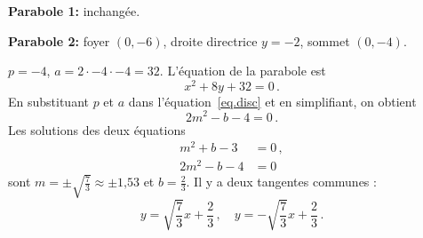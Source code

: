 \begin{example}\mbox{}

\noindent\textbf{Parabole 1:}
inchangée.

\noindent\textbf{Parabole 2:} foyer $(0,-6)$, droite directrice $y=-2$, sommet $(0,-4)$.

\noindent{}$p=-4$, $a=2\cdot -4\cdot -4=32$. L'équation de la parabole est 
\[
x^2+8y +32=0\,.
\]
En substituant $p$ et $a$ dans l'équation~\ref{eq.disc} et en simplifiant, on obtient 
\[
2m^2-b-4=0\,.
\]
Les solutions des deux équations 
\begin{align*}
m^2+b-3&=0\,,\\
2m^2-b-4&=0
\end{align*}
sont $m=\pm\sqrt{\displaystyle\frac{7}{3}}\approx \pm \mbox{1,53}$ et $b=\displaystyle\frac{2}{3}$. Il y a deux tangentes communes :
\[
y=\sqrt{\frac{7}{3}}x+\frac{2}{3}\,,\quad y=-\sqrt{\frac{7}{3}}x+\frac{2}{3}\,.
\]
\end{example}


